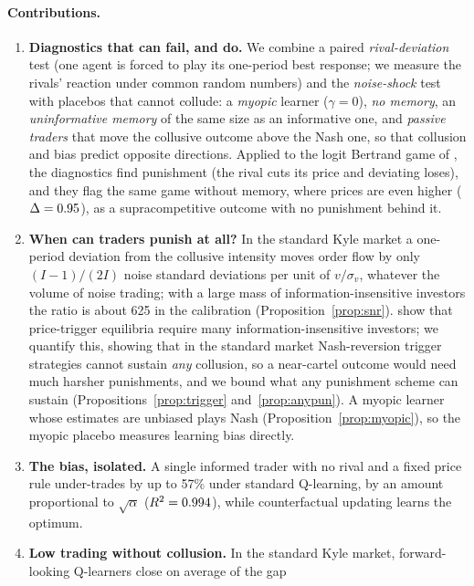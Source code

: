 \paragraph{Contributions.}
\begin{enumerate}
\item \textbf{Diagnostics that can fail, and do.} We combine a paired
  \emph{rival-deviation} test (one agent is forced to play its one-period
  best response; we measure the rivals' reaction under common random numbers)
  and the \citet{dou2025} \emph{noise-shock} test with placebos that cannot
  collude: a \emph{myopic} learner ($\gamma=0$), \emph{no memory}, an
  \emph{uninformative memory} of the same size as an informative one, and
  \emph{passive traders} that move the collusive outcome above the Nash one,
  so that collusion and bias predict opposite directions. Applied to the
  logit Bertrand game of \citet{calvano2020}, the diagnostics find punishment
  (the rival cuts its price and deviating loses), and they flag the same
  game without memory, where prices are even higher ($\Delta=0.95$), as a
  supracompetitive outcome with no punishment behind it.
\item \textbf{When can traders punish at all?} In the standard Kyle market a
  one-period deviation from the collusive intensity moves order flow by only
  $(I-1)/(2I)$ noise standard deviations per unit of $v/\sigma_v$, whatever
  the volume of noise trading; with a large mass of information-insensitive
  investors the ratio is about 625 in the \citet{dou2025} calibration
  (Proposition~\ref{prop:snr}). \citet{dou2025} show that price-trigger
  equilibria require many information-insensitive investors; we quantify
  this, showing that in the standard market Nash-reversion trigger strategies
  cannot sustain \emph{any} collusion, so a near-cartel outcome would need much harsher
  punishments, and we bound what any punishment scheme can sustain
  (Propositions~\ref{prop:trigger} and~\ref{prop:anypun}). A myopic learner
  whose estimates are unbiased plays Nash (Proposition~\ref{prop:myopic}), so
  the myopic placebo measures learning bias directly.
\item \textbf{The bias, isolated.} A single informed trader with no rival and
  a fixed price rule under-trades by up to 57\% under standard Q-learning, by
  an amount proportional to $\sqrt\alpha$ ($R^2=0.994$), while
  counterfactual updating learns the optimum.
\item \textbf{Low trading without collusion.} In the standard Kyle market,
  forward-looking Q-learners close on average \ResidDeltaInt{} of the gap

\end{enumerate}
